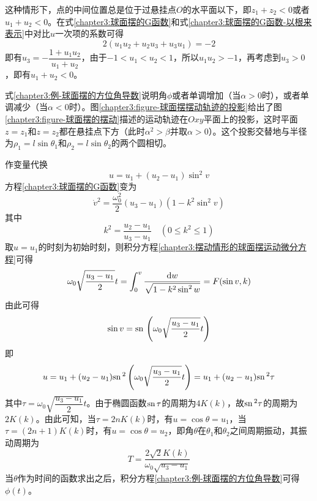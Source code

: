 \begin{example}[球面摆的运动]
\begin{enumerate}
这种情形下，点的中间位置总是位于过悬挂点$O$的水平面以下，即$z_1+z_2<0$或者$u_1+u_2<0$。在式\eqref{chapter3:球面摆的G函数}和式\eqref{chapter3:球面摆的G函数-以根来表示}中对比$u$一次项的系数可得
\begin{equation*}
	2(u_1u_2+u_2u_3+u_3u_1)=-2
\end{equation*}
即有$u_3=-\dfrac{1+u_1u_2}{u_1+u_2}$，由于$-1<u_1<u_2<1$，所以$u_1u_2>-1$，再考虑到$u_3>0$，即有$u_1+u_2<0$。

式\eqref{chapter3:例-球面摆的方位角导数}说明角$\phi$或者单调增加（当$\alpha>0$时），或者单调减少（当$\alpha<0$时）。图\ref{chapter3:figure-球面摆摆动轨迹的投影}给出了图\ref{chapter3:figure-球面摆的摆动}描述的运动轨迹在$Oxy$平面上的投影，这时平面$z=z_1$和$z=z_2$都在悬挂点下方（此时$\alpha^2>\beta$并取$\alpha>0$）。这个投影交替地与半径为$\rho_1=l\sin\theta_1$和$\rho_2=l\sin\theta_2$的两个圆相切。

作变量代换
\begin{equation*}
	u=u_1+(u_2-u_1)\sin^2v
\end{equation*}
方程\eqref{chapter3:球面摆的G函数}变为
\begin{equation}
	\dot{v}^2=\frac{\omega_0^2}{2}(u_3-u_1)(1-k^2\sin^2v)
	\label{chapter3:摆动情形的球面摆运动微分方程}
\end{equation}
其中
\begin{equation}
	k^2=\frac{u_2-u_1}{u_3-u_1}\quad (0\leqslant k^2\leqslant 1)
\end{equation}
取$u=u_1$的时刻为初始时刻，则积分方程\eqref{chapter3:摆动情形的球面摆运动微分方程}可得
\begin{equation}
	\omega_0\sqrt{\frac{u_3-u_1}{2}}t = \int_0^v\frac{\mathrm{d} w}{\sqrt{1-k^2\sin^2w}} = F(\sin v,k)
\end{equation}
由此可得
\begin{equation*}
	\sin v = \mathrm{sn}\, \left(\omega_0\sqrt{\frac{u_3-u_1}{2}}t\right)
\end{equation*}
即
\begin{equation}
	u = u_1+(u_2-u_1)\mathrm{sn}\,^2\left(\omega_0\sqrt{\frac{u_3-u_1}{2}}t\right)=u_1+(u_2-u_1)\mathrm{sn}\,^2\tau
\end{equation}
其中$\tau=\omega_0\sqrt{\dfrac{u_3-u_1}{2}}t$。由于椭圆函数$\mathrm{sn}\, \tau$的周期为$4K(k)$，故$\mathrm{sn}\,^2\tau$的周期为$2K(k)$。由此可知，当$\tau=2nK(k)$时，有$u=\cos\theta=u_1$，当$\tau=(2n+1)K(k)$时，有$u=\cos\theta=u_2$，即角$\theta$在$\theta_1$和$\theta_2$之间周期振动，其振动周期为
\begin{equation}
	T = \frac{2\sqrt{2}K(k)}{\omega_0\sqrt{u_3-u_1}}
\end{equation}
当$\theta$作为时间的函数求出之后，积分方程\eqref{chapter3:例-球面摆的方位角导数}可得$\phi(t)$。


\end{enumerate}
\end{example}
